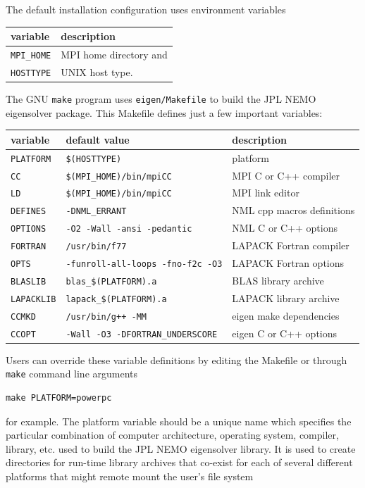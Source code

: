 \documentclass[twoside,12pt]{article}
\begin{document}
The default installation configuration uses environment variables
\begin{center}
\begin{tabular}{l|l}
variable	&description		\\
\hline
{\tt MPI\_HOME}	&MPI home directory and	\\
{\tt HOSTTYPE}	&UNIX host type.
\end{tabular}
\end{center}
The GNU {\tt make} program uses {\tt eigen/Makefile}
to build the JPL NEMO eigensolver package.
This Makefile defines just a few important variables:
\begin{center}
\begin{tabular}{l|l|l}
variable	&default value			&description		\\
\hline
{\tt PLATFORM}	&{\tt \$(HOSTTYPE)}		& platform		\\
{\tt CC}	&{\tt \$(MPI\_HOME)/bin/mpiCC}	& MPI C or C++ compiler	\\
{\tt LD}	&{\tt \$(MPI\_HOME)/bin/mpiCC}	& MPI link editor	\\
{\tt DEFINES}	&{\tt -DNML\_ERRANT}	& NML cpp macros definitions	\\
{\tt OPTIONS}	&{\tt -O2 -Wall -ansi -pedantic}& NML C or C++ options	\\
{\tt FORTRAN}	&{\tt /usr/bin/f77}		& LAPACK Fortran compiler\\
{\tt OPTS}	&{\tt -funroll-all-loops -fno-f2c -O3}& LAPACK Fortran options\\
{\tt BLASLIB}	&{\tt blas\_\$(PLATFORM).a}	& BLAS library archive	\\
{\tt LAPACKLIB}	&{\tt lapack\_\$(PLATFORM).a}	& LAPACK library archive\\
{\tt CCMKD}	&{\tt /usr/bin/g++ -MM}	& eigen make dependencies	\\
{\tt CCOPT}	&{\tt -Wall -O3 -DFORTRAN\_UNDERSCORE}& eigen C or C++ options
\end{tabular}
\end{center}
Users can override these variable definitions
by editing the Makefile or through {\tt make} command line arguments
\begin{verbatim}
make PLATFORM=powerpc
\end{verbatim}
for example.
The platform variable should be a unique name
which specifies the particular combination
of computer architecture, operating system, compiler, library, etc.
used to build the JPL NEMO eigensolver library.
It is used to create directories for run-time library archives
that co-exist for each of several different platforms
that might remote mount the user's file system
\end{document}
